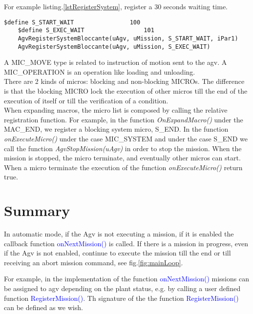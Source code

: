 For example listing.\ref{lstRegisterSystem}, register a 30 seconds waiting time.

\begin{lstlisting}[caption=Wait time system micro ,label=lstRegisterSystem]
	$define S_START_WAIT				100
	$define S_EXEC_WAIT					101
	AgvRegisterSystemBloccante(uAgv, uMission, S_START_WAIT, iPar1)
	AgvRegisterSystemBloccante(uAgv, uMission, S_EXEC_WAIT)
\end{lstlisting}
	

A MIC\_MOVE type is related to instruction of motion sent to the agv. A MIC\_OPERATION is an operation like loading and unloading. \\

There are 2 kinds of micros: blocking and non-blocking MICROs. The difference is that the blocking MICRO lock the execution of other micros till the end of the execution of itself or till the verification of a condition. \\

When expanding macros, the micro list is composed by calling the relative registration function.
For example, in the function \textit{OnExpandMacro()} under the MAC\_END, we register a blocking system micro, S\_END.
In the function \textit{onExecuteMicro()} under the case MIC\_SYSTEM and under the case S\_END we call the function \textit{AgvStopMission(uAgv)} in order to stop the mission.
When the mission is stopped, the micro terminate, and eventually other micros can start. When a micro terminate the execution of the function \textit{onExecuteMicro()} return true. \\



\section{Summary}
In automatic mode, if the Agv is not executing a mission, if it is enabled the callback function \textcolor{blue}{onNextMission()} is called. If there is a mission in progress, even if the Agv is not enabled, continue to execute the mission till the end or till receiving an abort mission command, see fig.\ref{fig:mainLoop}.

For example, in the implementation of the function \textcolor{blue}{onNextMission()} missions can be assigned to agv depending on the plant status, e.g. by calling a user defined function \textcolor{blue}{RegisterMission()}. Th signature of the the function \textcolor{blue}{RegisterMission()} can be defined as we wish.

